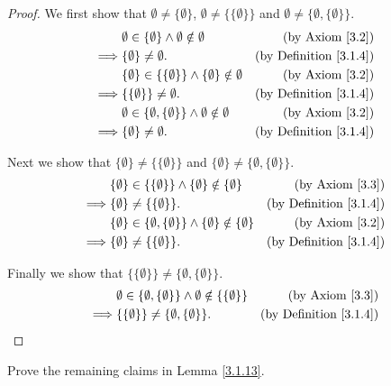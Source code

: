 \begin{proof}
We first show that \(\emptyset \neq \{\emptyset\}\), \(\emptyset \neq \{\{\emptyset\}\}\) and \(\emptyset \neq \{\emptyset, \{\emptyset\}\}\).
\begin{align*}
& \emptyset \in \{\emptyset\} \land \emptyset \notin \emptyset & \text{(by Axiom \ref{3.2})} \\
\implies & \{\emptyset\} \neq \emptyset. & \text{(by Definition \ref{3.1.4})} \\
& \{\emptyset\} \in \{\{\emptyset\}\} \land \{\emptyset\} \notin \emptyset & \text{(by Axiom \ref{3.2})} \\
\implies & \{\{\emptyset\}\} \neq \emptyset. & \text{(by Definition \ref{3.1.4})} \\
& \emptyset \in \{\emptyset, \{\emptyset\}\} \land \emptyset \notin \emptyset & \text{(by Axiom \ref{3.2})} \\
\implies & \{\emptyset\} \neq \emptyset. & \text{(by Definition \ref{3.1.4})}
\end{align*}

Next we show that \(\{\emptyset\} \neq \{\{\emptyset\}\}\) and \(\{\emptyset\} \neq \{\emptyset, \{\emptyset\}\}\).
\begin{align*}
& \{\emptyset\} \in \{\{\emptyset\}\} \land \{\emptyset\} \notin \{\emptyset\} & \text{(by Axiom \ref{3.3})} \\
\implies & \{\emptyset\} \neq \{\{\emptyset\}\}. & \text{(by Definition \ref{3.1.4})} \\
& \{\emptyset\} \in \{\emptyset, \{\emptyset\}\} \land \{\emptyset\} \notin \{\emptyset\} & \text{(by Axiom \ref{3.2})} \\
\implies & \{\emptyset\} \neq \{\{\emptyset\}\}. & \text{(by Definition \ref{3.1.4})}
\end{align*}

Finally we show that \(\{\{\emptyset\}\} \neq \{\emptyset, \{\emptyset\}\}\).
\begin{align*}
& \emptyset \in \{\emptyset, \{\emptyset\}\} \land \emptyset \notin \{\{\emptyset\}\} & \text{(by Axiom \ref{3.3})} \\
\implies & \{\{\emptyset\}\} \neq \{\emptyset, \{\emptyset\}\}. & \text{(by Definition \ref{3.1.4})}
\end{align*}
\end{proof}

\begin{exercise}\label{ex 3.1.3}
Prove the remaining claims in Lemma \ref{3.1.13}.
\end{exercise}

